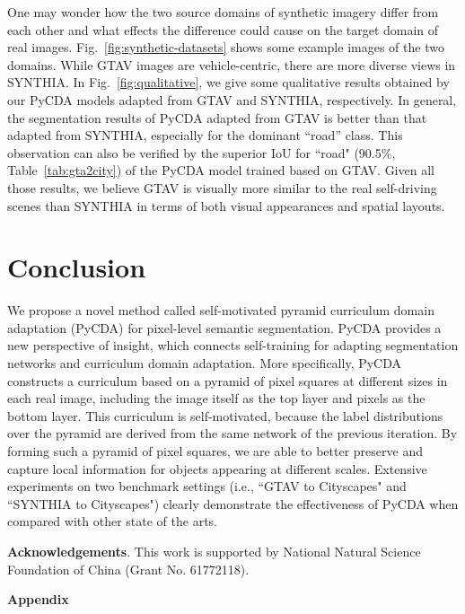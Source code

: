 \documentclass[10pt,twocolumn,letterpaper]{article}
\begin{document}
One may wonder how the two source domains of synthetic imagery differ from each other and what effects the difference could cause on the target domain of real images. Fig.~\ref{fig:synthetic-datasets} shows some example images of the two domains. While GTAV images are vehicle-centric, there are more diverse views in SYNTHIA. In Fig.~\ref{fig:qualitative}, we give some qualitative results obtained by our PyCDA models adapted from GTAV and SYNTHIA, respectively. In general, the segmentation results of PyCDA adapted from GTAV is  better than that adapted from SYNTHIA, especially for the dominant ``road'' class. This  observation can also be verified by the superior IoU for ``road" (90.5\%, Table~\ref{tab:gta2city}) of the PyCDA model trained based on GTAV. Given all those results, we believe GTAV is visually more similar to the real self-driving scenes than SYNTHIA in terms of both visual appearances and spatial layouts.



\section{Conclusion}
We propose a novel method called self-motivated pyramid curriculum domain adaptation (PyCDA) for pixel-level semantic segmentation. PyCDA provides a new perspective of insight, which connects self-training for adapting segmentation networks and curriculum domain adaptation. More specifically, PyCDA constructs a curriculum based on a pyramid of pixel squares at different sizes in each real image, including the image itself as the top layer and pixels as the bottom layer. This curriculum is self-motivated, because the label distributions over the pyramid are derived from the same network of the previous iteration. By forming such a pyramid of pixel squares, we are able to better preserve and capture local information for objects appearing at different scales. Extensive experiments on two benchmark settings (i.e., ``GTAV to Cityscapes" and ``SYNTHIA to Cityscapes") clearly demonstrate the effectiveness of PyCDA when compared with other state of the arts.

\noindent
{\bf Acknowledgements}.
This work is supported by National Natural Science Foundation of China (Grant No. 61772118).


{\small


}

\clearpage
\begin{center}
	\Large\textbf{Appendix}
\end{center}
\end{document}
